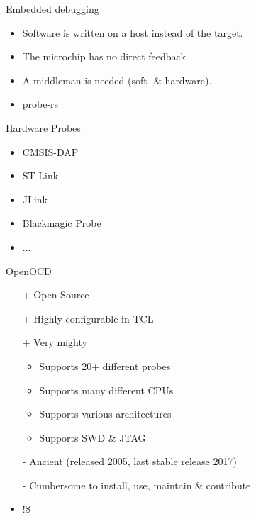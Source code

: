 \documentclass[aspectratio=1610,14pt,t]{beamer}
\begin{document}
\begin{frame}[c]{Embedded debugging}
  \begin{itemize}
    \item Software is written on a host instead of the target.
    \item The microchip has no direct feedback.
    \item A middleman is needed (soft- \& hardware).
    \item probe-rs
  \end{itemize}
\end{frame}

\begin{frame}[c]{Hardware Probes}
  \begin{itemize}
    \item CMSIS-DAP
    \item ST-Link
    \item JLink
    \item Blackmagic Probe
    \item ...
  \end{itemize}
\end{frame}

\begin{frame}[c]{OpenOCD}
  \begin{itemize}
    \item[+] Open Source
    \item[+] Highly configurable in TCL
    \item[+] Very mighty
      \begin{itemize}
        \item Supports 20+ different probes
        \item Supports many different CPUs
        \item Supports various architectures
        \item Supports SWD \& JTAG
      \end{itemize}
    \item[-] Ancient (released 2005, last stable release 2017)
    \item[-] Cumbersome to install, use, maintain \& contribute
    \item !\$
  \end{itemize}
\end{frame}
\end{document}
